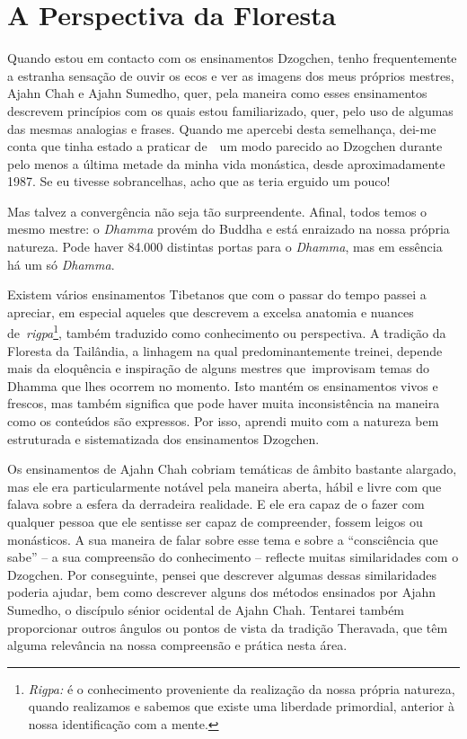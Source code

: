 \chapter{A Perspectiva da Floresta}

Quando estou em contacto com os ensinamentos Dzogchen, tenho
frequentemente a estranha sensação de ouvir os ecos e ver as imagens dos
meus próprios mestres, Ajahn Chah e Ajahn Sumedho, quer, pela maneira
como esses ensinamentos descrevem princípios com os quais estou
familiarizado, quer, pelo uso de algumas das mesmas analogias e frases.
Quando me apercebi desta semelhança, dei-me conta que tinha estado a
praticar de~~um modo parecido ao Dzogchen durante pelo menos a última
metade da minha vida monástica, desde aproximadamente 1987. Se eu
tivesse sobrancelhas, acho que as teria erguido um pouco!

Mas talvez a convergência não seja tão surpreendente. Afinal, todos
temos o mesmo mestre: o \emph{Dhamma} provém do Buddha e está enraizado
na nossa própria natureza. Pode haver 84.000 distintas portas para o
\emph{Dhamma}, mas em essência há um só \emph{Dhamma}.

Existem vários ensinamentos Tibetanos que com o passar do tempo passei a
apreciar, em especial aqueles que descrevem a excelsa anatomia e nuances
de~\emph{rigpa}\footnote{%
\emph{Rigpa:} é o conhecimento proveniente da realização da
nossa própria natureza, quando realizamos e sabemos que existe uma
liberdade primordial, anterior à nossa identificação com a mente.
}, também traduzido como conhecimento ou perspectiva.
A tradição da Floresta da Tailândia, a linhagem na qual
predominantemente treinei, depende mais da eloquência e inspiração de
alguns mestres que~improvisam temas do Dhamma que lhes ocorrem no
momento. Isto mantém os ensinamentos vivos e frescos, mas também
significa que pode haver muita inconsistência na maneira como os
conteúdos são expressos. Por isso, aprendi muito com a natureza bem
estruturada e sistematizada dos ensinamentos Dzogchen.

Os ensinamentos de Ajahn Chah cobriam temáticas de âmbito bastante alargado, mas ele era
particularmente notável pela maneira aberta, hábil e livre com que
falava sobre a esfera da derradeira realidade. E ele era capaz de o
fazer com qualquer pessoa que ele sentisse ser capaz de compreender,
fossem leigos ou monásticos. A sua maneira de falar sobre esse tema e
sobre a ``consciência que sabe'' -- a sua compreensão do conhecimento
-- reflecte muitas similaridades com o Dzogchen. Por conseguinte, pensei
que descrever algumas dessas similaridades poderia ajudar, bem como
descrever alguns dos métodos ensinados por Ajahn Sumedho, o discípulo
sénior ocidental de Ajahn Chah. Tentarei também proporcionar outros
ângulos ou pontos de vista da tradição Theravada, que têm alguma
relevância na nossa compreensão e prática nesta área.

